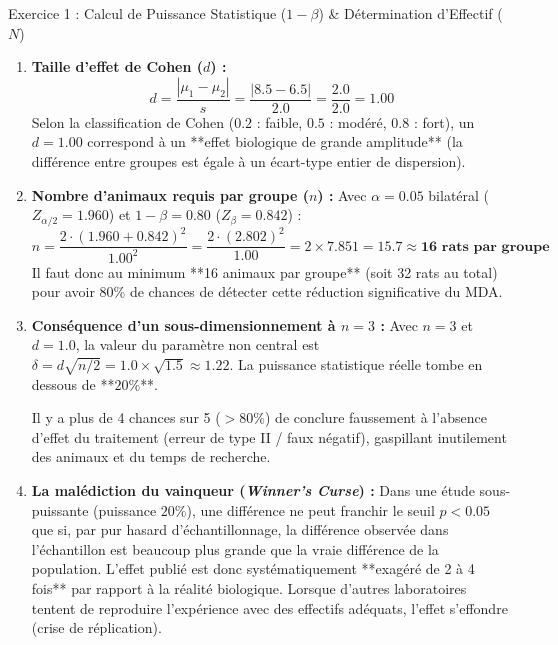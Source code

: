\documentclass[11pt,a4paper]{article}
\begin{document}

\begin{solutionbox}{Exercice 1 : Calcul de Puissance Statistique ($1-\beta$) \& Détermination d'Effectif ($N$)}
\begin{enumerate}[label=\textbf{\alph*.}]
  \item \textbf{Taille d'effet de Cohen ($d$) :}
  \begin{equation*}
    d = \frac{|\mu_1 - \mu_2|}{s} = \frac{|8.5 - 6.5|}{2.0} = \frac{2.0}{2.0} = \mathbf{1.00}
  \end{equation*}
  Selon la classification de Cohen ($0.2$ : faible, $0.5$ : modéré, $0.8$ : fort), un $d = 1.00$ correspond à un **effet biologique de grande amplitude** (la différence entre groupes est égale à un écart-type entier de dispersion).

  \item \textbf{Nombre d'animaux requis par groupe ($n$) :}
  Avec $\alpha = 0.05$ bilatéral ($Z_{\alpha/2} = 1.960$) et $1 - \beta = 0.80$ ($Z_\beta = 0.842$) :
  \begin{equation*}
    n = \frac{2 \cdot (1.960 + 0.842)^2}{1.00^2} = \frac{2 \cdot (2.802)^2}{1.00} = 2 \times 7.851 = 15.7 \approx \mathbf{16\text{ rats par groupe}}
  \end{equation*}
  Il faut donc au minimum **16 animaux par groupe** (soit 32 rats au total) pour avoir 80\% de chances de détecter cette réduction significative du MDA.

  \item \textbf{Conséquence d'un sous-dimensionnement à $n = 3$ :}
  Avec $n = 3$ et $d = 1.0$, la valeur du paramètre non central est $\delta = d \sqrt{n/2} = 1.0 \times \sqrt{1.5} \approx 1.22$. La puissance statistique réelle tombe en dessous de **$20\%$**.
  \par Il y a plus de 4 chances sur 5 ($> 80\%$) de conclure faussement à l'absence d'effet du traitement (erreur de type II / faux négatif), gaspillant inutilement des animaux et du temps de recherche.

  \item \textbf{La malédiction du vainqueur (\textit{Winner's Curse}) :}
  Dans une étude sous-puissante (puissance $20\%$), une différence ne peut franchir le seuil $p < 0.05$ que si, par pur hasard d'échantillonnage, la différence observée dans l'échantillon est beaucoup plus grande que la vraie différence de la population. L'effet publié est donc systématiquement **exagéré de 2 à 4 fois** par rapport à la réalité biologique. Lorsque d'autres laboratoires tentent de reproduire l'expérience avec des effectifs adéquats, l'effet s'effondre (crise de réplication).
\end{enumerate}
\end{solutionbox}
\end{document}
